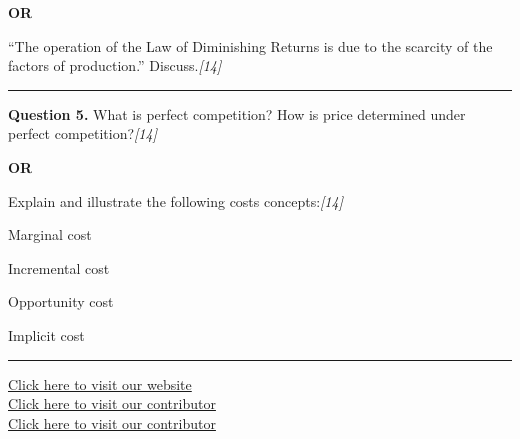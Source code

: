 \documentclass[11pt,a4paper]{article}
\newcommand{\pts}[1]{\hfill   \textit{[#1]}}
\begin{document}
\centerline{   \textbf{OR}}

``The operation of the Law of Diminishing Returns is due to the scarcity of the factors of production.'' Discuss.\pts{14}

\medskip\rule{\linewidth}{0.2pt}




\noindent   \textbf{Question 5.}
What is perfect competition? How is price determined under perfect competition?\pts{14}

\centerline{   \textbf{OR}}

Explain and illustrate the following costs concepts:\pts{14}

\begin{parts}
  \item Marginal cost
  \item Incremental cost
  \item Opportunity cost
  \item Implicit cost
\end{parts}

\vfill
\rule{\linewidth}{0.4pt}

\begin{center}\small
\href{https://bhu-exam.vercel.app/}{Click here to visit our website}\\[4pt]
\href{https://me-aryan.vercel.app/}{Click here to visit our contributor}\\[4pt]
\href{https://quashan-me.vercel.app/}{Click here to visit our contributor}
\end{center}
\end{document}
